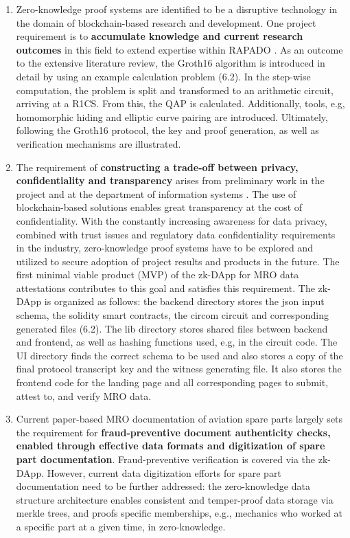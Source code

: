 \begin{enumerate}
    \item Zero-knowledge proof systems are identified to be a disruptive technology in the domain of blockchain-based research and development. One project requirement is to \textbf{accumulate knowledge and current research outcomes} in this field to extend expertise within RAPADO \citep{ZedelJ}. As an outcome to the extensive literature review, the Groth16 algorithm is introduced in detail by using an example calculation problem (6.2). In the step-wise computation, the problem is split and transformed to an arithmetic circuit, arriving at a R1CS. From this, the QAP is calculated. Additionally, tools, e.g, homomorphic hiding and elliptic curve pairing are introduced. Ultimately, following the Groth16 protocol, the key and proof generation, as well as verification mechanisms are illustrated.
    \item The requirement of \textbf{constructing a trade-off between privacy, confidentiality and transparency} arises from preliminary work in the project and at the department of information systems \citep{FornaconFrank, ZedelJ, semesterproject}. The use of blockchain-based solutions enables great transparency at the cost of confidentiality. With the constantly increasing awareness for data privacy, combined with trust issues and regulatory data confidentiality requirements in the industry, zero-knowledge proof systems have to be explored and utilized to secure adoption of project results and products in the future. The first minimal viable product (MVP) of the zk-DApp for MRO data attestations contributes to this goal and satisfies this requirement. The zk-DApp is organized as follows: the backend directory stores the json input schema, the solidity smart contracts, the circom circuit and corresponding generated files (6.2). The lib directory stores shared files between backend and frontend, as well as hashing functions used, e.g, in the circuit code. The UI directory finds the correct schema to be used and also stores a copy of the final protocol transcript key and the witness generating file. It also stores the frontend code for the landing page and all corresponding pages to submit, attest to, and verify MRO data.
    \item Current paper-based MRO documentation of aviation spare parts largely sets the requirement for \textbf{fraud-preventive document authenticity checks, enabled through effective data formats and digitization of spare part documentation}. Fraud-preventive verification is covered via the zk-DApp. However, current data digitization efforts for spare part documentation need to be further addressed: the zero-knowledge data structure architecture enables consistent and temper-proof data storage via merkle trees, and proofs specific memberships, e.g., mechanics who worked at a specific part at a given time, in zero-knowledge.
\end{enumerate}

